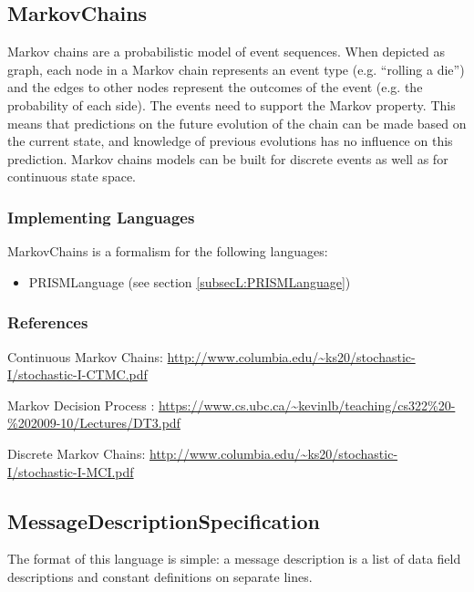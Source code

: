 \subsection{MarkovChains}
\label{subsecF:MarkovChains}

\author{Stefan}

Markov chains are a probabilistic model of event sequences.
When depicted as graph, each node in a Markov chain represents an event type (e.g. ``rolling a die'') and the edges to other nodes represent the outcomes of the event (e.g. the probability of each side).
The events need to support the Markov property. This means that predictions on the future evolution of the chain can be made based on the current state, and knowledge of previous evolutions has no influence on this prediction.
Markov chains models can be built for discrete events as well as for continuous state space.

\subsubsection{Implementing Languages}

MarkovChains is a formalism for the following languages:
\begin{itemize}
	\item PRISMLanguage (see section \ref{subsecL:PRISMLanguage})
\end{itemize}


\subsubsection{References}


Continuous Markov Chains: \url{http://www.columbia.edu/~ks20/stochastic-I/stochastic-I-CTMC.pdf}

Markov Decision Process : \url{https://www.cs.ubc.ca/~kevinlb/teaching/cs322%20-%202009-10/Lectures/DT3.pdf}

Discrete Markov Chains: \url{http://www.columbia.edu/~ks20/stochastic-I/stochastic-I-MCI.pdf}




\subsection{MessageDescriptionSpecification}
\label{subsecF:MessageDescriptionSpecification}
The format of this language is simple: a message description is a list of data field descriptions and constant definitions on separate lines.

